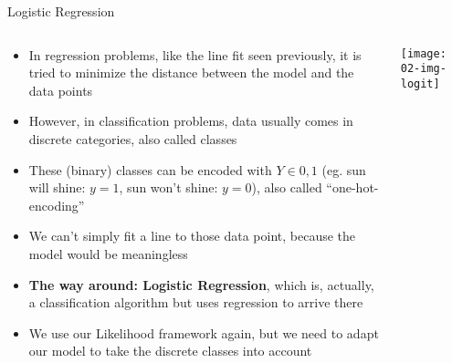   \begin{frame}{Logistic Regression}
    \begin{columns}
      \begin{column}{0.65\textwidth}
        \begin{itemize}
          \item In regression problems, like the line fit seen previously, it is tried to minimize the distance between the model and the data points
          \item However, in classification problems, data usually comes in discrete categories, also called classes
          \item These (binary) classes can be encoded with $Y\in {0, 1}$ (eg. sun will shine: $y=1$, sun won't shine: $y=0$), also called \enquote{one-hot-encoding}
          \item We can't simply fit a line to those data point, because the model would be meaningless
          \item \textbf{The way around: Logistic Regression}, which is, actually, a classification algorithm but uses regression to arrive there
          \item We use our Likelihood framework again, but we need to adapt our model to take the discrete classes into account
        \end{itemize}
      \end{column}
      \begin{column}{0.35\textwidth}
        \texttt{[image: 02-img-logit]}
      \end{column}
    \end{columns}
  \end{frame}

